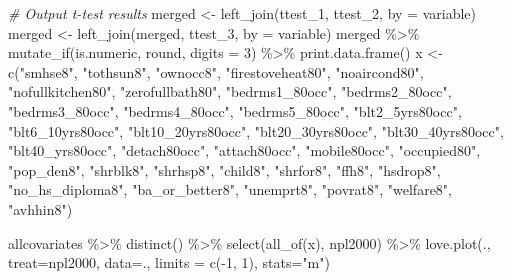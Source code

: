 \documentclass[
]{article}
\newenvironment{Shaded}{\begin{snugshade}}{\end{snugshade}}
\newcommand{\AttributeTok}[1]{\textcolor[rgb]{0.77,0.63,0.00}{#1}}
\newcommand{\CommentTok}[1]{\textcolor[rgb]{0.56,0.35,0.01}{\textit{#1}}}
\newcommand{\DecValTok}[1]{\textcolor[rgb]{0.00,0.00,0.81}{#1}}
\newcommand{\FunctionTok}[1]{\textcolor[rgb]{0.00,0.00,0.00}{#1}}
\newcommand{\NormalTok}[1]{#1}
\newcommand{\OtherTok}[1]{\textcolor[rgb]{0.56,0.35,0.01}{#1}}
\newcommand{\SpecialCharTok}[1]{\textcolor[rgb]{0.00,0.00,0.00}{#1}}
\newcommand{\StringTok}[1]{\textcolor[rgb]{0.31,0.60,0.02}{#1}}
\begin{document}
\begin{Shaded}
\begin{Highlighting}[]
\CommentTok{\# Output t{-}test results}
\NormalTok{merged }\OtherTok{\textless{}{-}} \FunctionTok{left\_join}\NormalTok{(ttest\_1, ttest\_2, }\AttributeTok{by =} \StringTok{\textquotesingle{}variable\textquotesingle{}}\NormalTok{)}
\NormalTok{merged }\OtherTok{\textless{}{-}} \FunctionTok{left\_join}\NormalTok{(merged, ttest\_3, }\AttributeTok{by =} \StringTok{\textquotesingle{}variable\textquotesingle{}}\NormalTok{)}
\NormalTok{merged }\SpecialCharTok{\%\textgreater{}\%} \FunctionTok{mutate\_if}\NormalTok{(is.numeric, round, }\AttributeTok{digits =} \DecValTok{3}\NormalTok{) }\SpecialCharTok{\%\textgreater{}\%} \FunctionTok{print.data.frame}\NormalTok{()}
\NormalTok{x }\OtherTok{\textless{}{-}} \FunctionTok{c}\NormalTok{(}\StringTok{"smhse8"}\NormalTok{, }\StringTok{"tothsun8"}\NormalTok{, }\StringTok{"ownocc8"}\NormalTok{, }\StringTok{"firestoveheat80"}\NormalTok{, }\StringTok{"noaircond80"}\NormalTok{, }
       \StringTok{"nofullkitchen80"}\NormalTok{, }\StringTok{"zerofullbath80"}\NormalTok{, }
       \StringTok{"bedrms1\_80occ"}\NormalTok{, }\StringTok{"bedrms2\_80occ"}\NormalTok{, }\StringTok{"bedrms3\_80occ"}\NormalTok{, }\StringTok{"bedrms4\_80occ"}\NormalTok{, }\StringTok{"bedrms5\_80occ"}\NormalTok{,}
       \StringTok{"blt2\_5yrs80occ"}\NormalTok{, }\StringTok{"blt6\_10yrs80occ"}\NormalTok{, }\StringTok{"blt10\_20yrs80occ"}\NormalTok{, }\StringTok{"blt20\_30yrs80occ"}\NormalTok{, }\StringTok{"blt30\_40yrs80occ"}\NormalTok{, }\StringTok{"blt40\_yrs80occ"}\NormalTok{,}
       \StringTok{"detach80occ"}\NormalTok{, }\StringTok{"attach80occ"}\NormalTok{, }\StringTok{"mobile80occ"}\NormalTok{, }\StringTok{"occupied80"}\NormalTok{,}
       \StringTok{"pop\_den8"}\NormalTok{, }\StringTok{"shrblk8"}\NormalTok{, }\StringTok{"shrhsp8"}\NormalTok{, }\StringTok{"child8"}\NormalTok{, }\StringTok{"shrfor8"}\NormalTok{, }\StringTok{"ffh8"}\NormalTok{, }
       \StringTok{"hsdrop8"}\NormalTok{, }\StringTok{"no\_hs\_diploma8"}\NormalTok{, }\StringTok{"ba\_or\_better8"}\NormalTok{, }\StringTok{"unemprt8"}\NormalTok{, }\StringTok{"povrat8"}\NormalTok{, }
       \StringTok{"welfare8"}\NormalTok{, }\StringTok{"avhhin8"}\NormalTok{)}

\NormalTok{allcovariates }\SpecialCharTok{\%\textgreater{}\%}
    \FunctionTok{distinct}\NormalTok{() }\SpecialCharTok{\%\textgreater{}\%}
    \FunctionTok{select}\NormalTok{(}\FunctionTok{all\_of}\NormalTok{(x), npl2000) }\SpecialCharTok{\%\textgreater{}\%}
    \FunctionTok{love.plot}\NormalTok{(., }\AttributeTok{treat=}\StringTok{\textquotesingle{}npl2000\textquotesingle{}}\NormalTok{, }\AttributeTok{data=}\NormalTok{., }\AttributeTok{limits =} \FunctionTok{c}\NormalTok{(}\SpecialCharTok{{-}}\DecValTok{1}\NormalTok{, }\DecValTok{1}\NormalTok{),}
            \AttributeTok{stats=}\StringTok{"m"}\NormalTok{)}


\end{Highlighting}
\end{Shaded}
\end{document}
